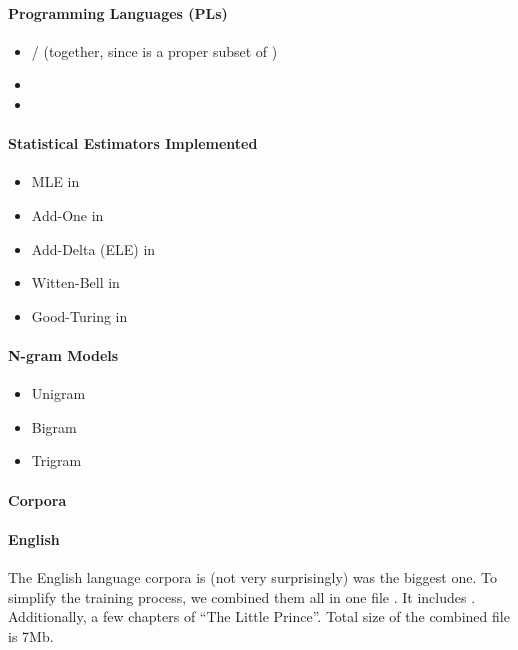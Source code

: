 \paragraph*{Programming Languages (PLs)}

\begin{itemize}
\item {\C}/{\cpp} (together, since {\C} is a proper subset of {\cpp})
\item {\java}
\item {\perl}
\end{itemize}

\paragraph*{Statistical Estimators Implemented}

\begin{itemize}
\item MLE in 
\item Add-One in 
\item Add-Delta (ELE) in 
\item Witten-Bell in 
\item Good-Turing in 
\end{itemize}

\paragraph*{N-gram Models}

\begin{itemize}
\item Unigram
\item Bigram
\item Trigram
\end{itemize}

\paragraph{Corpora}

\paragraph*{English}

The English language corpora is (not very surprisingly) was the biggest one.
To simplify the training process, we combined them all in one file
. It includes
\cite{probst95, ulysses, greif, speak, fannyhill, lysistrata, canterby, defoe, rousseau, tasso}.
Additionally, a few chapters of ``The Little Prince''.
Total size of the combined file is 7Mb.

